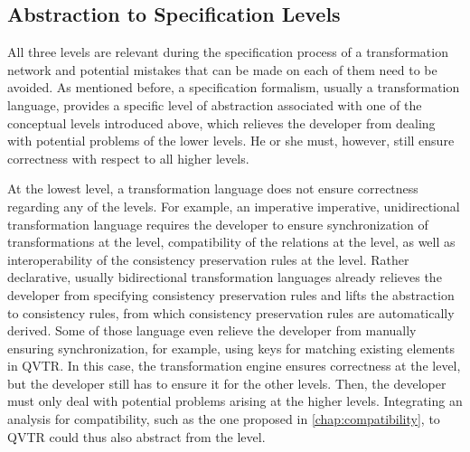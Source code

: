 \subsection{Abstraction to Specification Levels}

All three levels are relevant during the specification process of a transformation network and potential mistakes that can be made on each of them need to be avoided.
As mentioned before, a specification formalism, usually a transformation language, provides a specific level of abstraction associated with one of the conceptual levels introduced above, which relieves the developer from dealing with potential problems of the lower levels.
He or she must, however, still ensure correctness with respect to all higher levels.

At the lowest level, a transformation language does not ensure correctness regarding any of the levels.
For example, an imperative imperative, unidirectional transformation language requires the developer to ensure synchronization of transformations at the \leveltransformation level, compatibility of the relations at the \levelnetworkrelation level, as well as interoperability of the consistency preservation rules at the \levelnetworkrule level.
Rather declarative, usually bidirectional transformation languages already relieves the developer from specifying consistency preservation rules and lifts the abstraction to consistency rules, from which consistency preservation rules are automatically derived.
Some of those language even relieve the developer from manually ensuring synchronization, for example, using keys for matching existing elements in \gls{QVTR}.
In this case, the transformation engine ensures correctness at the \leveltransformation level, but the developer still has to ensure it for the other levels.
Then, the developer must only deal with potential problems arising at the higher levels.
Integrating an analysis for compatibility, such as the one proposed in \autoref{chap:compatibility}, to \gls{QVTR} could thus also abstract from the \levelnetworkrelation level.

